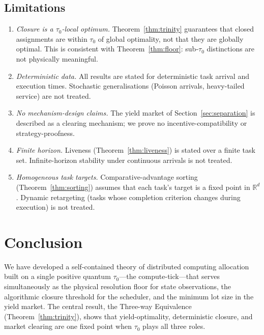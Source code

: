 \documentclass[11pt,twocolumn,a4paper]{article}
\theoremstyle{plain}
\theoremstyle{definition}
\theoremstyle{remark}
\newcommand{\R}{\mathbb{R}}
\newcommand{\tick}{\tau_0}
\begin{document}
\subsection{Limitations}

\begin{enumerate}[nosep]
\item \emph{Closure is a $\tick$-local optimum.} Theorem~\ref{thm:trinity} guarantees that closed assignments are within $\tick$ of global optimality, not that they are globally optimal. This is consistent with Theorem~\ref{thm:floor}: sub-$\tick$ distinctions are not physically meaningful.
\item \emph{Deterministic data.} All results are stated for deterministic task arrival and execution times. Stochastic generalisations (Poisson arrivals, heavy-tailed service) are not treated.
\item \emph{No mechanism-design claims.} The yield market of Section~\ref{sec:separation} is described as a clearing mechanism; we prove no incentive-compatibility or strategy-proofness.
\item \emph{Finite horizon.} Liveness (Theorem~\ref{thm:liveness}) is stated over a finite task set. Infinite-horizon stability under continuous arrivals is not treated.
\item \emph{Homogeneous task targets.} Comparative-advantage sorting (Theorem~\ref{thm:sorting}) assumes that each task's target is a fixed point in $\R^d$. Dynamic retargeting (tasks whose completion criterion changes during execution) is not treated.
\end{enumerate}

\section{Conclusion}
\label{sec:conclusion}

We have developed a self-contained theory of distributed computing allocation built on a single positive quantum $\tick$---the compute-tick---that serves simultaneously as the physical resolution floor for state observations, the algorithmic closure threshold for the scheduler, and the minimum lot size in the yield market. The central result, the Three-way Equivalence (Theorem~\ref{thm:trinity}), shows that yield-optimality, deterministic closure, and market clearing are one fixed point when $\tick$ plays all three roles.
\end{document}

